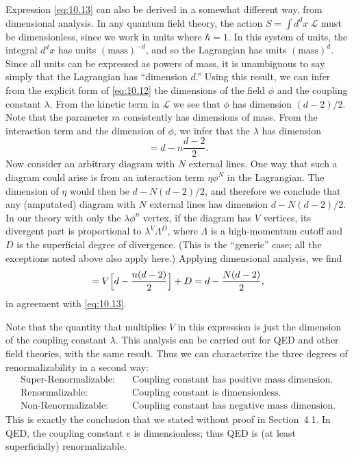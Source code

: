 Expression \eqref{eq:10.13} can also be derived in a somewhat different way,
from dimensional analysis.  In any quantum field theory, the action
$S = \int d^dx\ \mathcal{L}$ must be dimensionless, since we work in units
where $\hbar = 1$.  In this system of units, the integral $d^dx$ has units
$(\mathrm{mass})^{-d}$, and so the Lagrangian has units
$(\mathrm{mass})^d$.  Since all units can be expressed as powers of mass, it is
unambiguous to say simply that the Lagrangian has ``dimension $d$.''  Using
this result, we can infer from the explicit form of \eqref{eq:10.12} the
dimensions of the field $\phi$ and the coupling constant $\lambda$.  From the
kinetic term in $\mathcal{L}$ we see that $\phi$ has dimension $(d-2)/2$.  Note
that the parameter $m$ consistently has dimensions of mass.  From the
interaction term and the dimension of $\phi$, we infer that the $\lambda$ has
dimension
\begin{equation}
  [\lambda] = d - n\frac{d-2}{2} .
\end{equation}
Now consider an arbitrary diagram with $N$ external lines.  One way that such
a diagram could arise is from an interaction term $\eta\phi^N$ in the
Lagrangian.  The dimension of $\eta$ would then be
$d - N(d-2)/2$, and therefore we conclude that any (amputated) diagram with
$N$ external lines has dimension $d - N(d-2)/2$.  In our theory with only the
$\lambda\phi^n$ vertex, if the diagram has $V$ vertices, its divergent part is
proportional to $\lambda^V\Lambda^D$, where $\Lambda$ is a high-momentum
cutoff and $D$ is the superficial degree of divergence.  (This is the
``generic'' case; all the exceptions noted above also apply here.)  Applying
dimensional analysis, we find
\begin{equation}
  [\lambda^V\Lambda^D] = V\Bigl[ d - \frac{n(d-2)}{2} \Bigr] + D
  = d - \frac{N(d-2)}{2},
\end{equation}
in agreement with \eqref{eq:10.13}.

Note that the quantity that multiplies $V$ in this expression is just the
dimension of the coupling constant $\lambda$.  This analysis can be carried out
for QED and other field theories, with the same result.  Thus we can
characterize the three degrees of renormalizability in a second way:
\begin{equation}
  \begin{aligned}
    \text{Super-Renormalizable:}\quad & \text{Coupling constant has positive
      mass dimension.}\\
    \text{Renormalizable:}\quad & \text{Coupling constant is dimensionless.}\\
    \text{Non-Renormalizable:}\quad & \text{Coupling constant has negative
      mass dimension.}
  \end{aligned}
\end{equation}
This is exactly the conclusion that we stated without proof in Section~4.1.
In QED, the coupling constant $e$ is dimensionless; thus QED is (at least
superficially) renormalizable.

